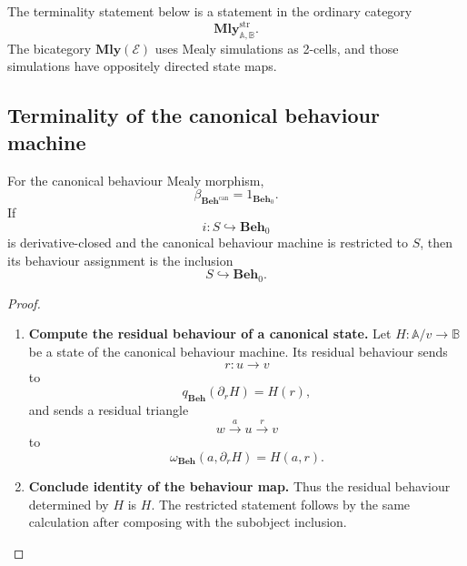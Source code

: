 \begin{remark}
\label{rem:terminality-not-bicategorical}
    The terminality statement below is a statement in the ordinary category
    \[
        \mathbf{Mly}^{\mathrm{str}}_{\mathbb A,\mathbb B}.
    \]
    The bicategory \(\mathbf{Mly}(\mathcal E)\) uses Mealy simulations as 2-cells, and those simulations have oppositely directed state maps.
\end{remark}

\subsection{Terminality of the canonical behaviour machine}
\label{subsec:terminality-canonical-behaviour-machine}

\begin{lemma}
\label{lem:canonical-behaviour-map-identity}
    For the canonical behaviour Mealy morphism,
    \[
        \beta_{\mathbf{Beh}^{\mathrm{can}}}=1_{\mathbf{Beh}_0}.
    \]
    If
    \[
        i:S\hookrightarrow\mathbf{Beh}_0
    \]
    is derivative-closed and the canonical behaviour machine is restricted to \(S\), then its behaviour assignment is the inclusion
    \[
        S\hookrightarrow\mathbf{Beh}_0.
    \]
\end{lemma}
\begin{proof}
    \leavevmode
    \begin{enumerate}
        \item \textbf{Compute the residual behaviour of a canonical state.} Let \(H:\mathbb A/v\to\mathbb B\) be a state of the canonical behaviour machine. Its residual behaviour sends
        \[
            r:u\to v
        \]
        to
        \[
            q_{\mathbf{Beh}}(\partial_rH)=H(r),
        \]
        and sends a residual triangle
        \[
            w\xrightarrow{a}u\xrightarrow{r}v
        \]
        to
        \[
            \omega_{\mathbf{Beh}}(a,\partial_rH)=H(a,r).
        \]

        \item \textbf{Conclude identity of the behaviour map.} Thus the residual behaviour determined by \(H\) is \(H\). The restricted statement follows by the same calculation after composing with the subobject inclusion.
    \end{enumerate}
\end{proof}


